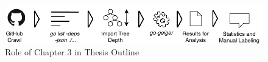 \begin{figure}[ht]
    \includegraphics[width=\textwidth]{assets/figures/chapter3/outline.pdf}
    \caption{Role of Chapter 3 in Thesis Outline}
    \label{fig:outline3}
\end{figure}
